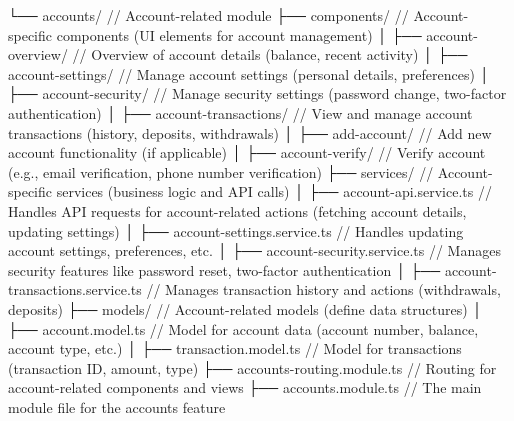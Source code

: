         └── accounts/                            // Account-related module
            ├── components/                      // Account-specific components (UI elements for account management)
            │   ├── account-overview/            // Overview of account details (balance, recent activity)
            │   ├── account-settings/            // Manage account settings (personal details, preferences)
            │   ├── account-security/            // Manage security settings (password change, two-factor authentication)
            │   ├── account-transactions/        // View and manage account transactions (history, deposits, withdrawals)
            │   ├── add-account/                 // Add new account functionality (if applicable)
            │   ├── account-verify/              // Verify account (e.g., email verification, phone number verification)
            ├── services/                        // Account-specific services (business logic and API calls)
            │   ├── account-api.service.ts       // Handles API requests for account-related actions (fetching account details, updating settings)
            │   ├── account-settings.service.ts  // Handles updating account settings, preferences, etc.
            │   ├── account-security.service.ts  // Manages security features like password reset, two-factor authentication
            │   ├── account-transactions.service.ts // Manages transaction history and actions (withdrawals, deposits)
            ├── models/                          // Account-related models (define data structures)
            │   ├── account.model.ts             // Model for account data (account number, balance, account type, etc.)
            │   ├── transaction.model.ts         // Model for transactions (transaction ID, amount, type)
            ├── accounts-routing.module.ts       // Routing for account-related components and views
            ├── accounts.module.ts               // The main module file for the accounts feature

